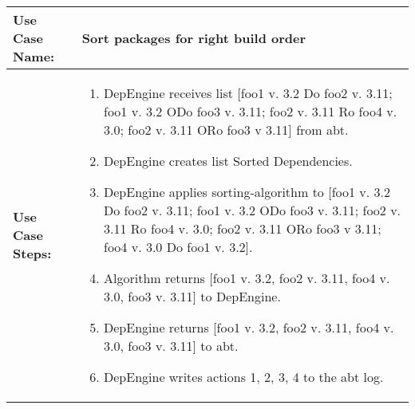 \begin{tabularx}{\linewidth}{|l|X|}
\hline
\textbf{Use Case Name:} & \textbf{Sort packages for right build order} \\
\hline
\textbf{Use Case Steps:} & 
\begin{minipage}{\linewidth} 
  \vspace{0.05em}
  \begin{enumerate}
  \item DepEngine receives list [foo1 v. 3.2 Do foo2 v. 3.11; foo1 v. 3.2 ODo foo3 v. 3.11; foo2 v. 3.11 Ro foo4 v. 3.0; foo2 v. 3.11 ORo foo3 v 3.11] from abt.
  \item DepEngine creates list Sorted Dependencies.
  \item DepEngine applies sorting-algorithm to [foo1 v. 3.2 Do foo2 v. 3.11; foo1 v. 3.2 ODo foo3 v. 3.11; foo2 v. 3.11 Ro foo4 v. 3.0; foo2 v. 3.11 ORo foo3 v 3.11; foo4 v. 3.0 Do foo1 v. 3.2].
   \item Algorithm returns [foo1 v. 3.2, foo2 v. 3.11, foo4 v. 3.0, foo3 v. 3.11] to DepEngine.
  \item DepEngine returns [foo1 v. 3.2, foo2 v. 3.11, foo4 v. 3.0, foo3 v. 3.11] to abt.  
  \item DepEngine writes actions 1, 2, 3, 4 to the abt log.
    \end{enumerate}
  \vspace{0.05em}
\end{minipage}
\\
\hline 
\end{tabularx}